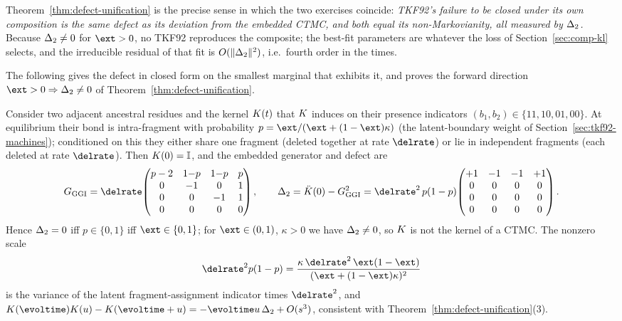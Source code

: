 Theorem~\ref{thm:defect-unification} is the precise sense in which the two
exercises coincide: \emph{TKF92's failure to be closed under its own
composition is the same defect as its deviation from the embedded CTMC, and
both equal its non-Markovianity, all measured by $\Delta_2$.}  Because
$\Delta_2\neq 0$ for $\ext>0$, no TKF92 reproduces the composite; the
best-fit parameters are whatever the loss of Section~\ref{sec:comp-kl}
selects, and the irreducible residual of that fit is $O(\|\Delta_2\|^2)$,
i.e.\ fourth order in the times.

The following gives the defect in closed form on the smallest marginal that
exhibits it, and proves the forward direction $\ext>0 \Rightarrow
\compdefect\neq 0$ of Theorem~\ref{thm:defect-unification}.

\begin{proposition}
\label{prop:minimal-defect}
Consider two adjacent ancestral residues and the kernel $K(t)$ that
$K$ induces on their presence indicators
$(b_1,b_2)\in\{11,10,01,00\}$.  At equilibrium their bond is intra-fragment
with probability $p = \ext/(\ext+(1-\ext)\kappa)$ (the latent-boundary
weight of Section~\ref{sec:tkf92-machines}); conditioned on this they
either share one fragment (deleted together at rate $\delrate$) or lie in
independent fragments (each deleted at rate $\delrate$).  Then
$K(0)=\mathbb{I}$, and the embedded generator and defect are
\[
\ggigen = \delrate\!\begin{pmatrix}
   p-2 & 1{-}p & 1{-}p & p\\ 0&-1&0&1\\ 0&0&-1&1\\ 0&0&0&0
 \end{pmatrix},
\qquad
\compdefect = \ddot\obskern(0)-\ggigen^2
 = \delrate^2\,p(1-p)\!
   \begin{pmatrix} {+}1&{-}1&{-}1&{+}1\\ 0&0&0&0\\ 0&0&0&0\\ 0&0&0&0
   \end{pmatrix}.
\]
Hence $\Delta_2 = 0$ iff $p\in\{0,1\}$ iff $\ext\in\{0,1\}$; for
$\ext\in(0,1)$, $\kappa>0$ we have $\Delta_2\neq 0$, so $K$ is
not the kernel of a CTMC.  The nonzero scale
\[
\delrate^2 p(1-p)
= \frac{\kappa\,\delrate^2\,\ext(1-\ext)}{(\ext+(1-\ext)\kappa)^2}
\]
is the variance of the latent fragment-assignment indicator times
$\delrate^2$, and
$\obskern(\evoltime)\obskern(\evolu)-\obskern(\evoltime+\evolu)
= -\evoltime\evolu\,\compdefect + O(s^3)$, consistent with
Theorem~\ref{thm:defect-unification}(3).
\end{proposition}

